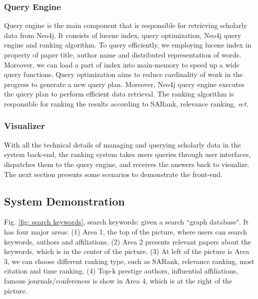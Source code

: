 {\subsubsection{Query Engine}
Query engine is the main component that is responsible for retrieving scholarly data from Neo4j. It consists of lucene index, query optimization, Neo4j query engine and ranking algorithm. To query efficiently, we employing lucene index in property of paper title, author name and distributed representation of words. Moreover, we can load a part of index into main-memory to speed up a wide query functions.
Query optimization aims to reduce cardinality of work in the progress to generate a new query plan. Moreover, Neo4j query engine executes the query plan to perform efficient data retrieval. The ranking algorithm is responsible for ranking the results according to SARank, relevance ranking,  \itshape ect. \upshape


\subsubsection{Visualizer}
With all the technical details of managing and querying scholarly data in the system back-end, the ranking system takes users queries through user interfaces, dispatches them to the query engine, and receives the answers back to visualize. The next section presents some scenarios to demonstrate the front-end.


\subsection{System Demonstration}
Fig. \ref{fig: search keywords}, search keywords: given a search ``graph database". It has four major areas: (1) Area 1, the top of the picture, where users can search keywords, authors and affiliations. (2) Area 2 presents relevant papers about the keywords, which is in the center of the picture. (3) At left of the picture is Area 3, we can choose different ranking type, such as SARank, relevance ranking, most citation and time ranking. (4) Top-k prestige authors, influential affiliations, famous journals/conferences is show in Area 4, which is at the right of the picture.


}